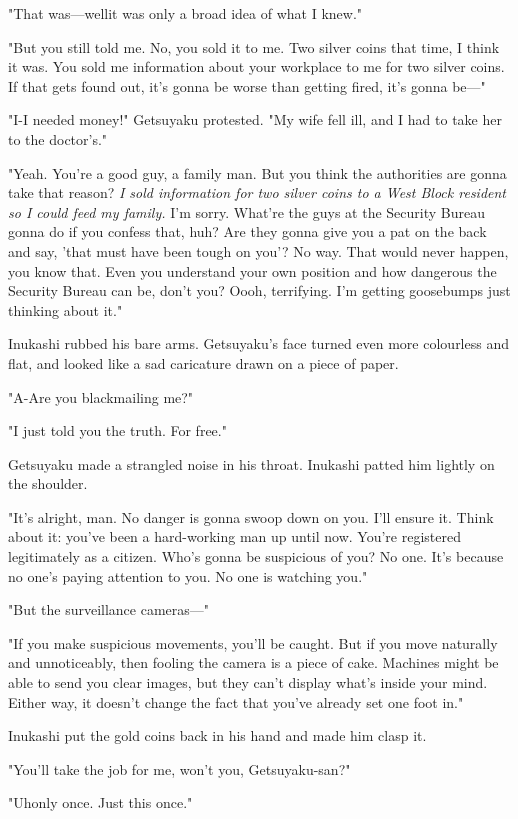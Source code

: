 "That was---well\el it was only a broad idea of what I knew."

"But you still told me. No, you sold it to me. Two silver coins that
time, I think it was. You sold me information about your workplace to me
for two silver coins. If that gets found out, it's gonna be worse than
getting fired, it's gonna be---"

"I-I needed money!" Getsuyaku protested. "My wife fell ill, and I had to
take her to the doctor's."

"Yeah. You're a good guy, a family man. But you think the authorities
are gonna take that reason? \emph{I sold information for two silver coins to a
West Block resident so I could feed my family.} I'm sorry. What're the
guys at the Security Bureau gonna do if you confess that, huh? Are they
gonna give you a pat on the back and say, 'that must have been tough on
you'? No way. That would never happen, you know that. Even you
understand your own position and how dangerous the Security Bureau can
be, don't you? Oooh, terrifying. I'm getting goosebumps just thinking
about it."

Inukashi rubbed his bare arms. Getsuyaku's face turned even more
colourless and flat, and looked like a sad caricature drawn on a piece
of paper.

"A-Are you blackmailing me?"

"I just told you the truth. For free."

Getsuyaku made a strangled noise in his throat. Inukashi patted him
lightly on the shoulder.

"It's alright, man. No danger is gonna swoop down on you. I'll ensure
it. Think about it: you've been a hard-working man up until now. You're
registered legitimately as a citizen. Who's gonna be suspicious of you?
No one. It's because no one's paying attention to you. No one is
watching you."

"But the surveillance cameras---"

"If you make suspicious movements, you'll be caught. But if you move
naturally and unnoticeably, then fooling the camera is a piece of cake.
Machines might be able to send you clear images, but they can't display
what's inside your mind. Either way, it doesn't change the fact that
you've already set one foot in."

Inukashi put the gold coins back in his hand and made him clasp it.

"You'll take the job for me, won't you, Getsuyaku-san?"

"Uh\el only once. Just this once."


